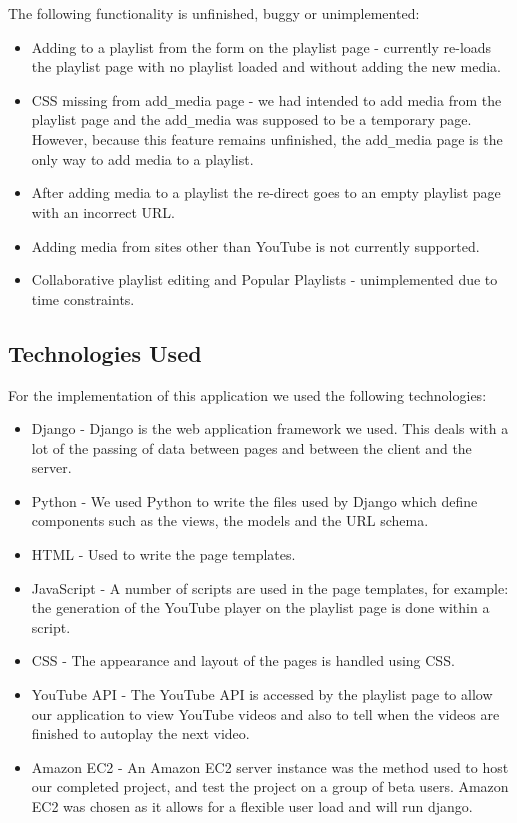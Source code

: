 \documentclass{sig-alt-release2}
\begin{document}

The following functionality is unfinished, buggy or unimplemented:

\begin{itemize}
\item Adding to a playlist from the form on the playlist page - currently re-loads the playlist page with no playlist loaded and without adding the new media.
\item CSS missing from add\verb=_=media page - we had intended to add media from the playlist page and the add\verb=_=media was supposed to be a temporary page. However, because this feature remains unfinished, the add\verb=_=media page is the only way to add media to a playlist.
\item After adding media to a playlist the re-direct goes to an empty playlist page with an incorrect URL.
\item Adding media from sites other than YouTube is not currently supported.
\item Collaborative playlist editing and Popular Playlists - unimplemented due to time constraints.
\end{itemize}

\subsection{Technologies Used}

For the implementation of this application we used the following technologies:

\begin{itemize}
\item Django - Django is the web application framework we used. This deals with a lot of the passing of data between pages and between the client and the server.
\item Python - We used Python to write the files used by Django which define components such as the views, the models and the URL schema. 
\item HTML - Used to write the page templates.
\item JavaScript - A number of scripts are used in the page templates, for example: the generation of the YouTube player on the playlist page is done within a script.
\item CSS - The appearance and layout of the pages is handled using CSS.
\item YouTube API - The YouTube API is accessed by the playlist page to allow our application to view YouTube videos and also to tell when the videos are finished to autoplay the next video.
\item Amazon EC2 - An Amazon EC2 server instance was the method used to host our completed project, and test the project on a group of beta users. Amazon EC2 was chosen as it allows for a flexible user load and will run django.
\end{itemize}
\end{document}
